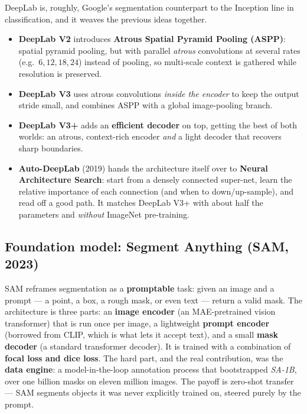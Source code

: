 \documentclass[11pt, oneside]{book}
\begin{document}
DeepLab is, roughly, Google's segmentation counterpart to the Inception line in
classification, and it weaves the previous ideas together.
\begin{itemize}
  \item \textbf{DeepLab V2} introduces \textbf{Atrous Spatial Pyramid Pooling
        (ASPP)}: spatial pyramid pooling, but with parallel \emph{atrous}
        convolutions at several rates (e.g.\ $6,12,18,24$) instead of pooling, so
        multi-scale context is gathered while resolution is preserved.
  \item \textbf{DeepLab V3} uses atrous convolutions \emph{inside the encoder} to
        keep the output stride small, and combines ASPP with a global image-pooling
        branch.
  \item \textbf{DeepLab V3+} adds an \textbf{efficient decoder} on top, getting the
        best of both worlds: an atrous, context-rich encoder \emph{and} a light
        decoder that recovers sharp boundaries.
  \item \textbf{Auto-DeepLab} (2019) hands the architecture itself over to
        \textbf{Neural Architecture Search}: start from a densely connected
        super-net, learn the relative importance of each connection (and when to
        down/up-sample), and read off a good path. It matches DeepLab V3+ with
        about half the parameters and \emph{without} ImageNet pre-training.
\end{itemize}

\subsection{Foundation model: Segment Anything (SAM, 2023)}

SAM reframes segmentation as a \textbf{promptable} task: given an image and a
prompt --- a point, a box, a rough mask, or even text --- return a valid mask.
The architecture is three parts: an \textbf{image encoder} (an MAE-pretrained
vision transformer) that is run once per image, a lightweight \textbf{prompt
encoder} (borrowed from CLIP, which is what lets it accept text), and a small
\textbf{mask decoder} (a standard transformer decoder). It is trained with a
combination of \textbf{focal loss and dice loss}. The hard part, and the real
contribution, was the \textbf{data engine}: a model-in-the-loop annotation
process that bootstrapped \emph{SA-1B}, over one billion masks on eleven million
images. The payoff is zero-shot transfer --- SAM segments objects it was never
explicitly trained on, steered purely by the prompt.
\end{document}
